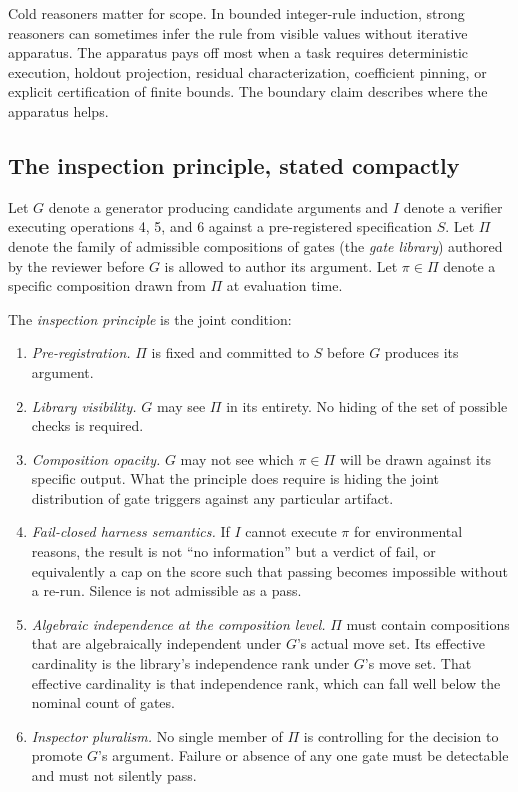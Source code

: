 \documentclass[
  11pt,
]{article}
\begin{document}
Cold reasoners matter for scope. In bounded integer-rule
induction, strong reasoners can sometimes infer the rule from visible
values without iterative apparatus. The apparatus pays off most when a
task requires deterministic execution, holdout projection, residual
characterization, coefficient pinning, or explicit certification of finite
bounds. The boundary claim describes where the apparatus helps.

\subsection{The inspection principle, stated
compactly}\label{the-inspection-principle-stated-compactly}

Let \(G\) denote a generator producing candidate arguments and \(I\)
denote a verifier executing operations 4, 5, and 6 against a
pre-registered specification \(S\). Let \(\Pi\) denote the family of
admissible compositions of gates (the \emph{gate library}) authored by
the reviewer before \(G\) is allowed to author its argument. Let
\(\pi \in \Pi\) denote a specific composition drawn from \(\Pi\) at
evaluation time.

The \emph{inspection principle} is the joint condition:

\begin{enumerate}
\def\labelenumi{\arabic{enumi}.}
\item
  \emph{Pre-registration.} \(\Pi\) is fixed and committed to \(S\)
  before \(G\) produces its argument.
\item
  \emph{Library visibility.} \(G\) may see \(\Pi\) in its entirety. No
  hiding of the set of possible checks is required.
\item
  \emph{Composition opacity.} \(G\) may not see which \(\pi \in \Pi\)
  will be drawn against its specific output. What the principle does
  require is hiding the joint distribution of gate triggers against any
  particular artifact.
\item
  \emph{Fail-closed harness semantics.} If \(I\) cannot execute
  \(\pi\) for environmental reasons, the result is not ``no
  information'' but a verdict of \(\text{fail}\), or equivalently a cap
  on the score such that passing becomes impossible without a re-run.
  Silence is not admissible as a pass.
\item
  \emph{Algebraic independence at the composition level.} \(\Pi\) must
  contain compositions that are algebraically independent under \(G\)'s
  actual move set. Its effective cardinality is the library's independence
  rank under \(G\)'s move set. That effective cardinality is that
  independence rank, which can fall well below the nominal count of gates.
\item
  \emph{Inspector pluralism.} No single member of \(\Pi\) is
  controlling for the decision to promote \(G\)'s argument. Failure or
  absence of any one gate must be detectable and must not silently pass.
\end{enumerate}
\end{document}
